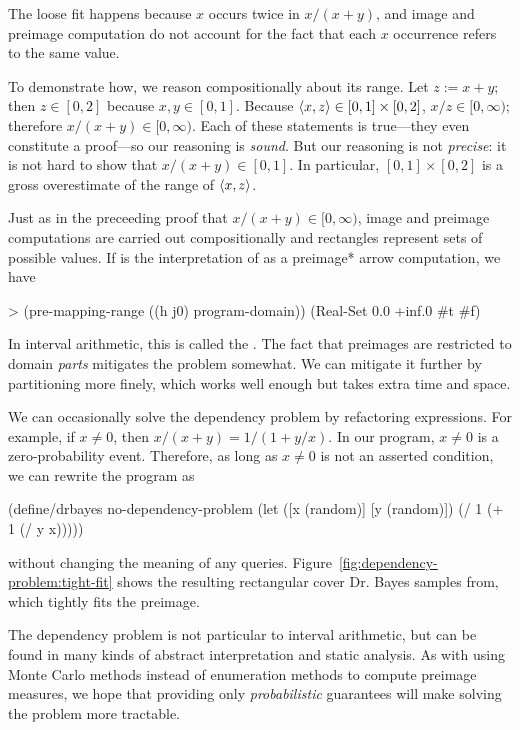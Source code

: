 The loose fit happens because $x$ occurs twice in $x{/}(x+y)$, and image and preimage computation do not account for the fact that each $x$ occurrence refers to the same value.

To demonstrate how, we reason compositionally about its range.
Let $z := x + y$; then $z \in [0,2]$ because $x,y \in [0,1]$.
Because $\langle{x,z}\rangle \in [0,1] \times [0,2]$, $x{/}z \in [0,\infty)$; therefore $x{/}(x+y) \in [0,\infty)$.
Each of these statements is true---they even constitute a proof---so our reasoning is \emph{sound}.
But our reasoning is not \emph{precise}: it is not hard to show that $x{/}(x+y) \in [0,1]$.
In particular, $[0,1] \times [0,2]$ is a gross overestimate of the range of $\langle{x,z}\rangle$.

Just as in the preceeding proof that $x{/}(x+y) \in [0,\infty)$, image and preimage computations are carried out compositionally and rectangles represent sets of possible values.
If  is the interpretation of  as a preimage* arrow computation, we have
\begin{center}\singlespacing
\begin{schemedisplay}
> (pre-mapping-range ((h j0) program-domain))
(Real-Set 0.0 +inf.0 #t #f)
\end{schemedisplay}
\end{center}
In interval arithmetic, this is called the .
The fact that preimages are restricted to domain \emph{parts} mitigates the problem somewhat.
We can mitigate it further by partitioning more finely, which works well enough but takes extra time and space.

We can occasionally solve the dependency problem by refactoring expressions.
For example, if $x \neq 0$, then $x{/}(x+y) = 1{/}(1+y{/}x)$.
In our program, $x \neq 0$ is a zero-probability event.
Therefore, as long as $x \neq 0$ is not an asserted condition, we can rewrite the program as
\begin{center}\singlespacing
\begin{schemedisplay}
(define/drbayes no-dependency-problem
  (let ([x  (random)]
        [y  (random)])
    (/ 1 (+ 1 (/ y x)))))
\end{schemedisplay}
\end{center}
without changing the meaning of any queries.
Figure~\ref{fig:dependency-problem:tight-fit} shows the resulting rectangular cover Dr. Bayes samples from, which tightly fits the preimage.

The dependency problem is not particular to interval arithmetic, but can be found in many kinds of abstract interpretation and static analysis.
As with using Monte Carlo methods instead of enumeration methods to compute preimage measures, we hope that providing only \emph{probabilistic} guarantees will make solving the problem more tractable.


